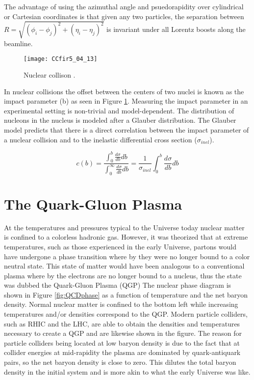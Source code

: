 \noindent
The advantage of using the azimuthal angle and psuedorapidity over cylindrical or Cartesian coordinates is that given any two particles, the separation between $R = \sqrt{ (\phi_{i} - \phi_{j})^{2} + (\eta_{i} - \eta_{j})^{2}  } $ is invariant under all Lorentz boosts along the beamline.


\begin{figure}[h]
\texttt{[image: CCfir5\_04\_13]}
\centering
\caption{Nuclear collison  .}
\label{fig:centrality}
\end{figure}

\noindent
In nuclear collisions the offset between the centers of two nuclei is known as the impact parameter (b) as seen in Figure \ref{fig:centrality}.  Measuring the impact parameter in an experimental setting is non-trivial and model-dependent.  The distribution of nucleons in the nucleus is modeled after a Glauber distribution\cite{Loizides:2016djv}.  The Glauber model predicts that there is a direct correlation between the impact parameter of a nuclear collision and to the inelastic differential cross section ($\sigma_{inel}$)\cite{Miller:2007ri}.


\begin{equation}
c(b) =\frac{ \int_{0}^{b} \frac{d \sigma}{db} db}{ \int_{0}^{\infty} \frac{d \sigma}{db} db} = \frac{1}{\sigma_{inel}} \int_{0}^{b} \frac{d \sigma}{db} db
\label{eq:centrality}
\end{equation}

\fi




\section{The Quark-Gluon Plasma}
At the temperatures and pressures typical to the Universe today nuclear matter is confined to a colorless hadronic gas.  However, it was theorized that at extreme temperatures, such as those experienced in the early Universe, partons would have undergone a phase transition where by they were no longer bound to a color neutral state.  This state of matter would have been analogous to a conventional plasma where by the electrons are no longer bound to a nucleus, thus the state was dubbed the Quark-Gluon Plasma (QGP)
The nuclear phase diagram is shown in Figure \ref{fig:QCDphase} as a function of temperature and the net baryon density.  Normal nuclear matter is confined to the bottom left while increasing temperatures and/or densities correspond to the QGP.  Modern particle colliders, such as RHIC and the LHC, are able to obtain the densities and temperatures necessary to create a QGP and are likewise shown in the figure.  The reason for particle colliders being located at low baryon density is due to the fact that at collider energies at mid-rapidity the plasma are dominated by quark-antiquark pairs, so the net baryon density is close to zero.  This dilutes the total baryon density in the initial system and is more akin to what the early Universe was like.  



